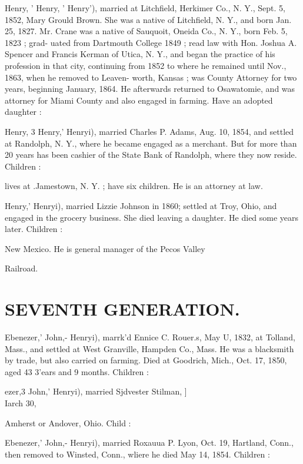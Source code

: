 \documentclass[oneside]{book}
\begin{document}
Henry, ' Henry, ' Henry'), married at Litchfield, Herkimer Co., 
N. Y., Sept. 5, 1852, Mary Grould Brown. She was a native of 
Litchfield, N. Y., and born Jan. 25, 1827. Mr. Crane was a 
native of Sauquoit, Oneida Co., N. Y., born Feb. 5, 1823 ; grad- 
uated from Dartmouth College 1849 ; read law with Hon. Joshua 
A. Spencer and Francis Kerman of Utica, N. Y., and began the 
practice of his profession in that city, continuing from 1852 to 
where he remained until Nov., 1863, when he removed to Leaven- 
worth, Kansas ; was County Attorney for two years, beginning 
January, 1864. He afterwards returned to Osawatomie, and was 
attorney for Miami County and also engaged in farming. Have 
an adopted daughter : 


Henry, 3 Henry,' Henryi), married Charles P. Adams, Aug. 10, 
1854, and settled at Randolph, N. Y., where he became engaged 
as a merchant. But for more than 20 years has been cashier of 
the State Bank of Randolph, where they now reside. Children : 


lives at .Jamestown, N. Y. ; have six children. He is an 
attorney at law. 


Henry,' Henryi), married Lizzie Johnson in 1860; settled at 
Troy, Ohio, and engaged in the grocery business. She died 
leaving a daughter. He died some years later. Children : 



New Mexico. He is general manager of the Pecos Valley 

Railroad. 



\section{SEVENTH GENERATION.}


Ebenezer,' John,- Henryi), marrk'd Ennice C. Rouer.s, May U, 
1832, at Tolland, Mass., and settled at West Granville, Hampden 
Co., Mass. He was a blacksmith by trade, but also carried on 
farming. Died at Goodrich, Mich., Oct. 17, 1850, aged 43 3'ears 
and 9 months. Children : 


ezer,3 John,' Henryi), married Sjdvester Stilman, ]\\Iarch 30, 


Amherst or Andover, Ohio. Child : 


Ebenezer,' John,- Henryi), married Roxauua P. Lyon, Oct. 19, 
Hartland, Conn., then removed to Winsted, Conn., wliere he 
died May 14, 1854. Children : 
\end{document}
